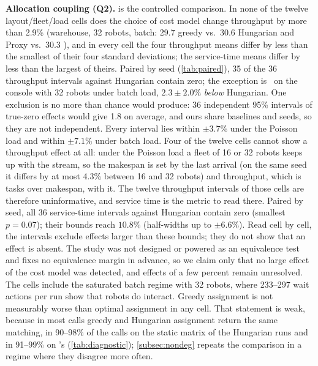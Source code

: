 \noindent\textbf{Allocation coupling (Q2).}
 is the controlled comparison. In none of the twelve
layout/fleet/load cells does the choice of cost model change throughput by
more than 2.9\% (warehouse, 32 robots, batch: 29.7 greedy vs.\ 30.6
Hungarian and Proxy vs.\ 30.3 \sname), and in every cell the four throughput
means differ by less than the smallest of their four standard deviations;
the service-time means differ by less than the largest of theirs. Paired by seed (\cref{tab:paired}), 35 of the 36 throughput intervals
against Hungarian contain zero; the exception is \sname\ on the console with
32 robots under batch load, $2.3\pm2.0\%$ \emph{below} Hungarian. One
exclusion is no more than chance would produce: 36 independent 95\%
intervals of true-zero effects would give 1.8 on average, and ours share
baselines and seeds, so they are not independent. Every interval
lies within $\pm3.7\%$ under the Poisson load and within $\pm7.1\%$ under
batch load. Four of the twelve cells cannot show a throughput effect at all:
under the Poisson load a fleet of 16 or 32 robots keeps up with the stream,
so the makespan is set by the last arrival (on the same seed it differs by
at most 4.3\% between 16 and 32 robots) and throughput, which is tasks over
makespan, with it. The twelve throughput intervals of those cells are
therefore uninformative, and service time is the metric to read there.
Paired by seed, all 36 service-time intervals against Hungarian contain zero
(smallest $p=0.07$); their bounds reach $10.8\%$ (half-widths up to $\pm6.6\%$). Read cell by cell, the intervals exclude effects larger than
these bounds; they do not show that an effect is absent. The study was not
designed or powered as an equivalence test and fixes no equivalence margin
in advance, so we claim only that no large effect of the cost model was
detected, and effects of a few percent remain unresolved. The cells include
the saturated batch regime with 32 robots, where 233--297 wait actions per run
show that robots do interact. Greedy assignment is not measurably worse than
optimal assignment in any cell. That statement is weak, because in most calls
greedy and Hungarian assignment return the same matching, in 90--98\% of the
calls on the static matrix of the Hungarian runs and in 91--99\% on \sname's
(\cref{tab:diagnostic}); \cref{subsec:nondeg} repeats the comparison in a regime
where they disagree more often.

